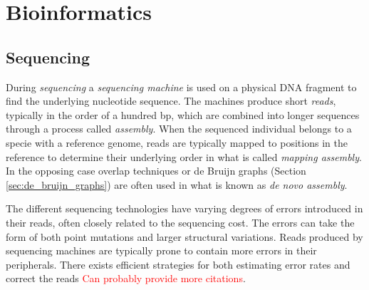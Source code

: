 \documentclass[thesis.tex]{subfiles}
\begin{document}
\section{Bioinformatics}
\subsection{Sequencing}
\label{sec:sequencing}
During \textit{sequencing} a \textit{sequencing machine} is used on a physical DNA fragment to find the underlying nucleotide sequence. The machines produce short \textit{reads}, typically in the order of a hundred bp\cite{sequencing_platforms}, which are combined into longer sequences through a process called \textit{assembly}. When the sequenced individual belongs to a specie with a reference genome, reads are typically mapped to positions in the reference to determine their underlying order in what is called \textit{mapping assembly}. In the opposing case overlap techniques\cite{an_eulerian_path_approach_to_dna_fragment_assembly} or de Bruijn graphs (Section \ref{sec:de_bruijn_graphs}) are often used in what is known as \textit{de novo assembly}\cite[Chapter 1, p. 19]{introduction_to_genomics}.\\
\par\noindent
The different sequencing technologies have varying degrees of errors introduced in their reads, often closely related to the sequencing cost\cite{sequencing_platforms}. The errors can take the form of both point mutations and larger structural variations. Reads produced by sequencing machines are typically prone to contain more errors in their peripherals. There exists efficient strategies for both estimating error rates \cite{estimation_of_sequencing_error_rates_in_short_reads} and correct the reads\cite{error_correction_of_datasets_with_non_uniform_coverage} \textcolor{red}{Can probably provide more citations}.
\end{document}
